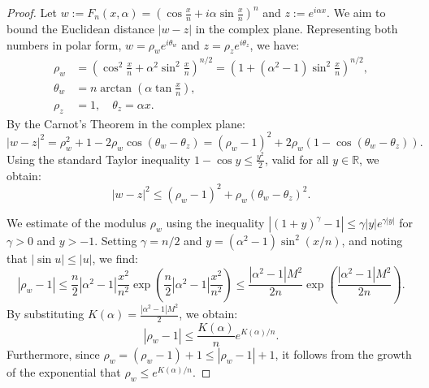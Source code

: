 \documentclass[10pt,a4paper]{amsart}
\begin{document}
\begin{proof}
Let $w := F_n(x, \alpha) = \left(\cos\frac{x}{n} + i\alpha \sin\frac{x}{n}\right)^n$ and $z := e^{i\alpha x}$. We aim to bound the Euclidean distance $|w-z|$ in the complex plane. Representing both numbers in polar form, $w = \rho_w e^{i\theta_w}$ and $z = \rho_z e^{i\theta_z}$, we have:
\begin{align*}
    \rho_w &= \left(\cos^2 \frac{x}{n} + \alpha^2 \sin^2 \frac{x}{n}\right)^{n/2} = \left( 1 + (\alpha^2-1)\sin^2 \frac{x}{n} \right)^{n/2}, \\
    \theta_w &= n \arctan \left(\alpha \tan \frac{x}{n}\right), \\
    \rho_z &= 1, \quad \theta_z = \alpha x.
\end{align*}
By the Carnot's Theorem in the complex plane:
\begin{equation} \label{eq:carnot_id}
    |w-z|^2 = \rho_w^2 + 1 - 2\rho_w \cos(\theta_w - \theta_z) = (\rho_w - 1)^2 + 2\rho_w(1 - \cos(\theta_w - \theta_z)).
\end{equation}
Using the standard Taylor inequality $1 - \cos y \leq \frac{y^2}{2}$, valid for all $y \in \mathbb{R}$, we obtain:
\begin{equation} \label{eq:main_ineq_proof}
    |w-z|^2 \leq (\rho_w - 1)^2 + \rho_w (\theta_w - \theta_z)^2.
\end{equation}

\medskip
We estimate of the modulus $\rho_w$
using the inequality $|(1+y)^\gamma - 1| \leq \gamma |y| e^{\gamma |y|}$ for $\gamma > 0$ and $y > -1$. Setting $\gamma = n/2$ and $y = (\alpha^2-1)\sin^2(x/n)$, and noting that $|\sin u| \le |u|$, we find:
\[
    |\rho_w - 1| \leq \frac{n}{2} |\alpha^2-1| \frac{x^2}{n^2} \exp\left( \frac{n}{2} |\alpha^2-1| \frac{x^2}{n^2} \right) \leq \frac{|\alpha^2-1|M^2}{2n} \exp\left( \frac{|\alpha^2-1|M^2}{2n} \right).
\]
By substituting $K(\alpha) = \frac{|\alpha^2-1|M^2}{2}$, we obtain:
\begin{equation} \label{eq:rho_est}
    |\rho_w - 1| \leq \frac{K(\alpha)}{n} e^{K(\alpha)/n}.
\end{equation}
Furthermore, since $\rho_w = (\rho_w - 1) + 1 \le |\rho_w - 1| + 1$, it follows from the growth of the exponential that $\rho_w \leq e^{K(\alpha)/n}$.


\end{proof}
\end{document}
